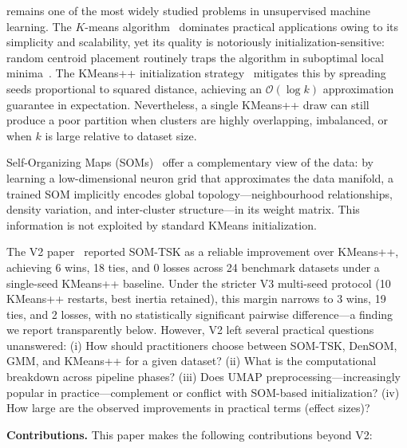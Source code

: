 \documentclass[journal]{IEEEtran}
\begin{document}
 remains one of the most widely studied problems in unsupervised machine learning. The $K$-means algorithm~\cite{macqueen1967some,lloyd1982least} dominates practical applications owing to its simplicity and scalability, yet its quality is notoriously initialization-sensitive: random centroid placement routinely traps the algorithm in suboptimal local minima~\cite{arthur2007kmeans}. The KMeans++ initialization strategy~\cite{arthur2007kmeans} mitigates this by spreading seeds proportional to squared distance, achieving an $\mathcal{O}(\log k)$ approximation guarantee in expectation. Nevertheless, a single KMeans++ draw can still produce a poor partition when clusters are highly overlapping, imbalanced, or when $k$ is large relative to dataset size.

Self-Organizing Maps (SOMs)~\cite{kohonen1982self,kohonen2001self} offer a complementary view of the data: by learning a low-dimensional neuron grid that approximates the data manifold, a trained SOM implicitly encodes global topology---neighbourhood relationships, density variation, and inter-cluster structure---in its weight matrix. This information is not exploited by standard KMeans initialization.

The V2 paper~\cite{somtskv2} reported SOM-TSK as a reliable improvement over KMeans++, achieving 6 wins, 18 ties, and 0 losses across 24 benchmark datasets under a single-seed KMeans++ baseline. Under the stricter V3 multi-seed protocol (10 KMeans++ restarts, best inertia retained), this margin narrows to 3 wins, 19 ties, and 2 losses, with no statistically significant pairwise difference---a finding we report transparently below. However, V2 left several practical questions unanswered: (i) How should practitioners choose between SOM-TSK, DenSOM, GMM, and KMeans++ for a given dataset? (ii) What is the computational breakdown across pipeline phases? (iii) Does UMAP preprocessing---increasingly popular in practice---complement or conflict with SOM-based initialization? (iv) How large are the observed improvements in practical terms (effect sizes)?

\textbf{Contributions.} This paper makes the following contributions beyond V2:
\end{document}
